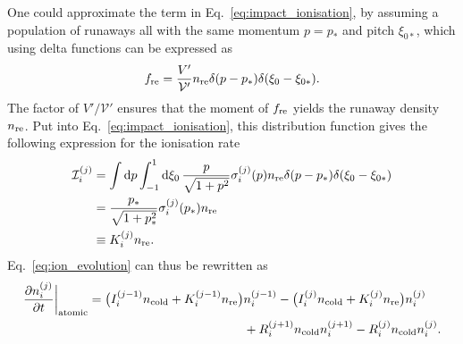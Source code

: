 \documentclass{notes}
\renewcommand{\ne}{n_{\rm cold}}
\newcommand{\fre}{f_{\rm re}}
\newcommand{\nre}{n_{\rm re}}
\newcommand{\nij}[2]{n_{#1}^{(#2)}}
\newcommand{\Iij}[2]{I_{#1}^{(#2)}}
\newcommand{\Rij}[2]{R_{#1}^{(#2)}}
\newcommand{\kinIij}[2]{\mathcal{I}_{#1}^{(#2)}}
\newcommand{\sigmaij}{\sigma_i^{(j)}}
\newcommand{\Vp}{\mathcal{V}'}
\newcommand{\VpVol}{V'}
\begin{document}
   One could approximate the term in Eq.~\eqref{eq:impact_ionisation}, by assuming a population of runaways all with the same momentum $p=p_*$ and pitch $\xi_{0*}$, which using delta functions can be expressed as
   \begin{align}
       \fre=\frac{\VpVol}{\Vp}\nre\delta(p-p_*)\delta(\xi_0-\xi_{0*}).
   \end{align}
   The factor of $\VpVol/\Vp$ ensures that the  moment of $\fre$ yields the runaway density $\nre$.
   Put into Eq.~\eqref{eq:impact_ionisation}, this distribution function gives the following expression for the ionisation rate
   \begin{align}
        \kinIij{i}{j}
        &=\int\dd{p}\int_{-1}^1\dd{\xi_0}\frac{p}{\sqrt{1+p^2}}\sigmaij(p)\nre\delta(p-p_*)\delta(\xi_0-\xi_{0*})\\
        &=\frac{p_*}{\sqrt{1+p_*^2}}\sigmaij(p_*)\nre\\
        &\equiv K_i^{(j)}\nre.
    \end{align}
    Eq.~\eqref{eq:ion_evolution} can thus be rewritten as
    \begin{align}
        \pdv{\nij{i}{j}}{t}\bigg|_{\rm atomic}
        =\big(\Iij{i}{j-1} \ne + K_i^{(j-1)}\nre\big) &\nij{i}{j-1}
        -\big(\Iij{i}{j} \ne + K_i^{(j)}\nre\big) \nij{i}{j}\\
        &+\Rij{i}{j+1} \ne \nij{i}{j+1}
        -\Rij{i}{j} \ne \nij{i}{j}.
   \end{align}
\end{document}
